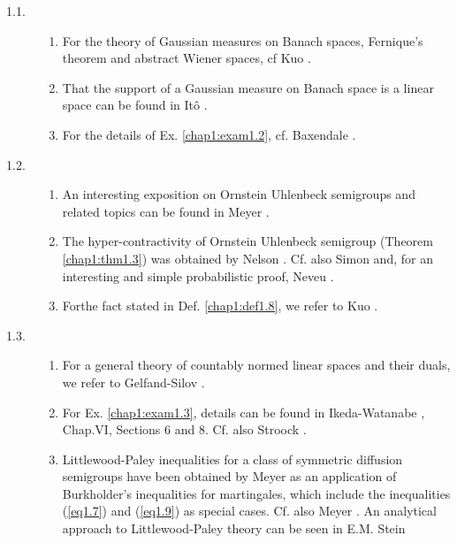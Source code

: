 \begin{description}
\item[1.1.]
\begin{enumerate}
\renewcommand{\theenumi}{\alph{enumi}}
\renewcommand{\labelenumi}{(\theenumi)}
\item For the theory of Gaussian measures on Banach spaces, Fernique's 
  theorem and abstract Wiener spaces, cf Kuo \cite{key5}. 

\renewcommand{\labelenumi}{(\theenumi)}
\item That the support of a Gaussian measure on Banach space is a
  linear space can be found in It\^{o} \cite{key4}. 

\item For the details of Ex. \ref{chap1:exam1.2}, cf. Baxendale \cite{key1}.
\end{enumerate}

\item[1.2.]
\begin{enumerate}
\renewcommand{\theenumi}{\alph{enumi}}
\renewcommand{\labelenumi}{(\theenumi)}
\item An interesting exposition on Ornstein Uhlenbeck
  semigroups and related topics can be found in Meyer \cite{key10}. 

\item The hyper-contractivity of Ornstein Uhlenbeck semigroup 
  (Theorem \ref{chap1:thm1.3}) was obtained by Nelson
  \cite{key11}. Cf. also Simon \cite{key14} and, for an interesting and
  simple probabilistic proof,  Neveu \cite{key12}. 

\item For\pageoriginale the fact stated in Def. \ref{chap1:def1.8}, we
  refer to Kuo \cite{key5}.  
\end{enumerate}

\item[1.3.]
\begin{enumerate}
\renewcommand{\theenumi}{\alph{enumi}}
\renewcommand{\labelenumi}{(\theenumi)}
\item For a general theory of countably normed linear spaces and their
  duals, we refer to Gelfand-Silov \cite{key2}.

\item For Ex. \ref{chap1:exam1.3}, details can be found in
  Ikeda-Watanabe \cite{key3},  Chap.VI, Sections 6 and 8. Cf. also
  Stroock \cite{key19}.  

\item Littlewood-Paley inequalities for a class of symmetric diffusion
  semigroups have been obtained by Meyer \cite{key9} as an application of
  Burkholder's inequalities for martingales, which include the
  inequalities (\ref{eq1.7}) and (\ref{eq1.9}) as special cases. Cf. also Meyer
  \cite{key10}. An analytical approach to Littlewood-\break Paley theory can be
  seen in E.M. Stein \cite{key15}
 

\end{enumerate}
\end{description}
